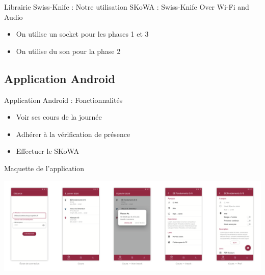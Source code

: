 \documentclass[aspectratio=169]{beamer}
\begin{document}
\begin{frame}{Librairie Swiss-Knife : Notre utilisation}
  SKoWA : Swiss-Knife Over Wi-Fi and Audio
  \bigskip

  \begin{itemize}
    \item On utilise un socket pour les phases 1 et 3
    \item On utilise du son pour la phase 2
  \end{itemize}
\end{frame}

\subsection{Application Android}

\begin{frame}{Application Android : Fonctionnalités}

  \begin{itemize}
    \item Voir ses cours de la journée
    \item Adhérer à la vérification de présence
    \item Effectuer le SKoWA
  \end{itemize}

\end{frame}

\begin{frame}{Maquette de l'application}
  \begin{adjustwidth}{-1.8em}{2em}
    \centering
    \includegraphics[width=1.1\textwidth]{../assets/maquette.png}
  \end{adjustwidth}
\end{frame}
\end{document}
